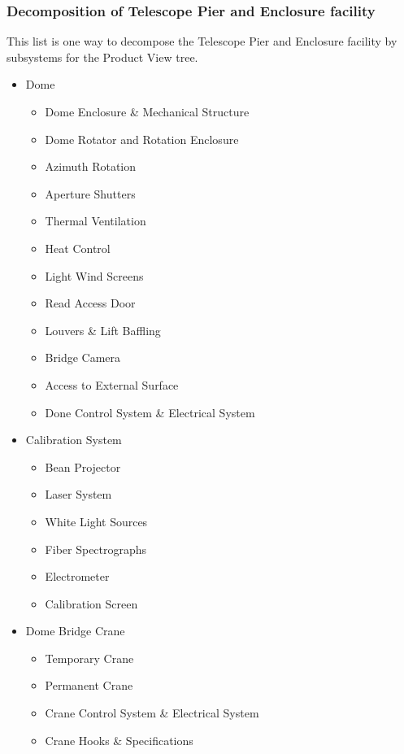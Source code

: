 \subsubsection{Decomposition of Telescope Pier and Enclosure facility}

This list is one way to decompose the Telescope Pier and Enclosure facility by subsystems for the Product View tree.

\begin{small}
\begin{itemize}
	\item Dome
	\begin{itemize}
		\item Dome Enclosure \& Mechanical Structure
		\item Dome Rotator and Rotation Enclosure
		\item Azimuth Rotation
		\item Aperture Shutters
		\item Thermal Ventilation
		\item Heat Control
		\item Light Wind Screens
		\item Read Access Door
		\item Louvers \& Lift Baffling
		\item Bridge Camera
		\item Access to External Surface
		\item Done Control System \& Electrical System
	\end{itemize}

	\item Calibration System
	\begin{itemize}
		\item Bean Projector
		\item Laser System
		\item White Light Sources
		\item Fiber Spectrographs
		\item Electrometer
		\item Calibration Screen
	\end{itemize}

	\item Dome Bridge Crane
	\begin{itemize}
		\item Temporary Crane
		\item Permanent Crane
		\item Crane Control System \& Electrical System
		\item Crane Hooks \& Specifications
	\end{itemize}


\end{itemize}
\end{small}
